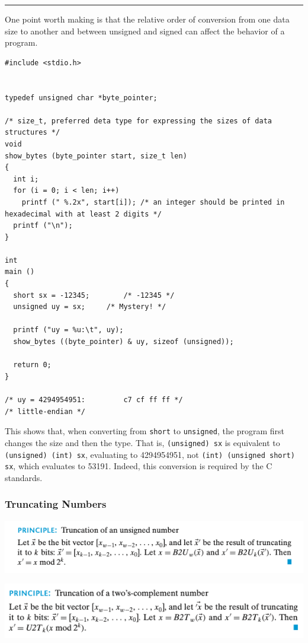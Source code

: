 \documentclass[11pt]{article}
\begin{document}
\noindent\rule{\textwidth}{0.5pt}
One point worth making is that the relative order of conversion from one data size to another and between unsigned and signed can affect the behavior of a program.\\
\begin{verbatim}
#include <stdio.h>


typedef unsigned char *byte_pointer;

/* size_t, preferred deta type for expressing the sizes of data structures */
void
show_bytes (byte_pointer start, size_t len)
{
  int i;
  for (i = 0; i < len; i++)
    printf (" %.2x", start[i]);	/* an integer should be printed in hexadecimal with at least 2 digits */
  printf ("\n");
}

int
main ()
{
  short sx = -12345;		/* -12345 */
  unsigned uy = sx;		/* Mystery! */

  printf ("uy = %u:\t", uy);
  show_bytes ((byte_pointer) & uy, sizeof (unsigned));

  return 0;
}

/* uy = 4294954951:         c7 cf ff ff */
/* little-endian */

\end{verbatim}
This shows that, when converting from \texttt{short} to \texttt{unsigned}, the program first changes the size and then the type. That is, \texttt{(unsigned) sx} is equivalent to \texttt{(unsigned) (int) sx}, evaluating to 4294954951, not \texttt{(int) (unsigned short) sx}, which evaluates to 53191. Indeed, this conversion is required by the C standards.\\



\subsubsection{Truncating Numbers}
\label{sec:org332bfcf}

\begin{center}
\includegraphics[width=.9\linewidth]{pics/truncation-of-an-unsigned-number.png}
\end{center}

\begin{center}
\includegraphics[width=.9\linewidth]{pics/truncation-of-a-two's-complement-number.png}
\end{center}
\end{document}
